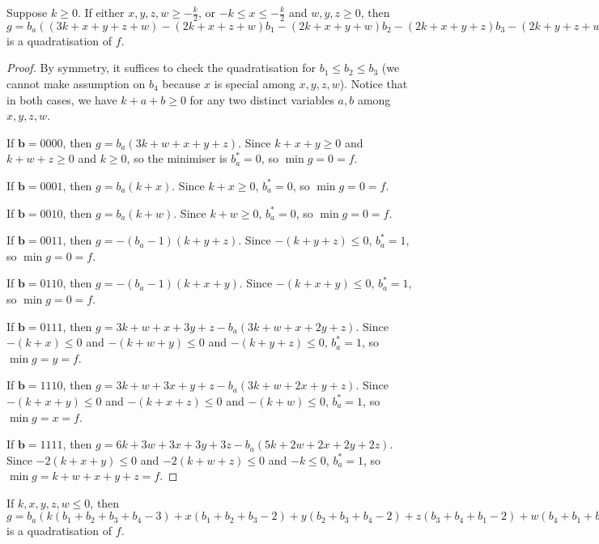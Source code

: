 \documentclass[11pt]{scrartcl}
\newcommand{\vc}[1]{\boldsymbol{#1}}
\begin{document}
\begin{lemma}
	\label{1small3large}
	Suppose $k \ge 0$. If either $x, y, z, w \ge -\frac{k}{2}$, or  $-k\le x \le -\frac{k}{2}$ and $w, y, z \ge 0$, then $g = b_a((3k+x+y+z+w) - (2k+x+z+w)b_1 - (2k+x+y+w)b_2 - (2k+x+y+z)b_3 - (2k+y+z+w)b_4) + k(b_1b_2+b_1b_3+b_1 b_4+ b_2b_3+b_2b_4+b_3b_4) + x(b_1b_2+b_1b_3+b_2b_3) + y(b_2b_3+b_2b_4+b_3b_4) + z(b_1b_3+b_1b_4+b_3b_4) + w(b_1b_2+b_1b_4+b_2b_4)$  is a quadratisation of $f$.
\end{lemma}

\begin{proof}
	By symmetry, it suffices to check the quadratisation for $b_1 \le b_2 \le b_3$ (we cannot make assumption on $b_4$ because $x$ is special among $x, y, z, w$).
	Notice that in both cases, we have $k + a + b \ge 0$ for any two distinct variables $a, b$ among $x, y, z, w$.
	
If $\vc b = 0000$, then $g = b_a(3k + w + x + y + z)$. Since $k + x + y \ge 0 $ and $k+w + z\ge 0$ and $k \ge 0$, so the minimiser is $b_a^* = 0$, so $\min g = 0 = f$.

If $\vc b = 0001$, then $g = b_a(k + x)$. Since $k + x\ge 0$, $b_a^* = 0$, so $\min g = 0 = f$.

If $\vc b = 0010$, then $g = b_a(k + w)$. Since $k + w \ge 0$, $b_a^* = 0$, so $\min g = 0 = f$.

If $\vc b = 0011$, then $g = -(b_a - 1)(k + y + z)$. Since $-(k+y+z) \le 0$, $b_a^* = 1$, so $\min g = 0 = f$.

If $\vc b = 0110$, then $g = -(b_a - 1)(k + x + y)$. Since $-(k+x+y) \le 0$, $b_a^* = 1$, so $\min g = 0 = f$.

If $\vc b = 0111$, then $g = 3k + w + x + 3y + z - b_a(3k + w + x + 2y + z)$.
Since $-(k+x) \le 0$ and $-(k+w+y) \le 0$ and $-(k+ y+z)\le 0$, $b_a^* = 1$, so $\min g = y = f$.

If $\vc b = 1110$, then $g = 3k + w + 3x + y + z - b_a(3k + w + 2x + y + z)$.
Since $-(k+x+y) \le 0$ and $-(k+x+z) \le 0$ and $-(k+w) \le 0 $, $b_a^* = 1$, so $\min g = x = f$.

If $\vc b = 1111$, then $g = 6k + 3w + 3x + 3y + 3z - b_a(5k + 2w + 2x + 2y + 2z)$.
Since $-2(k+x+y) \le 0$ and $-2(k+w+z) \le 0$ and $-k \le 0$,  $b_a^* = 1$, so $\min g = k+ w+ x + y + z = f$.
\end{proof}




\begin{lemma}
	\label{allnegative}
	If $ k, x, y, z, w \le 0 $, then $g = b_a(k(b_1+b_2+b_3+b_4-3) + 
	x(b_1+b_2+b_3-2) + y(b_2+b_3+b_4-2) + z(b_3+b_4+b_1-2) + w(b_4+b_1+b_2-2))$ is a quadratisation of $f$.
\end{lemma}
\end{document}

